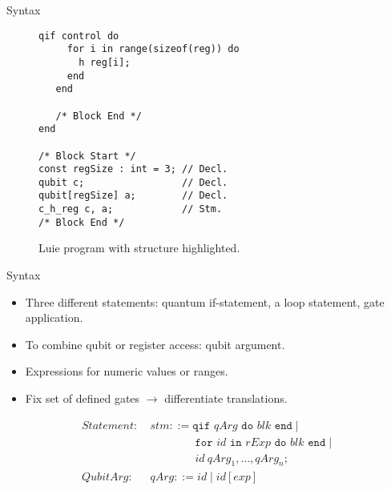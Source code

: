 \begin{frame}[fragile]{Syntax}
\begin{minipage}{.50\textwidth}
\begin{figure}[htp]
\begin{lstlisting}[style=Luie, basicstyle=\ttfamily\large]
   qif control do
     for i in range(sizeof(reg)) do
       h reg[i];  
     end
   end

   /* Block End */
end

/* Block Start */
const regSize : int = 3; // Decl.
qubit c;                 // Decl.
qubit[regSize] a;        // Decl.
c_h_reg c, a;            // Stm.
/* Block End */
            \end{lstlisting}
            \caption{Luie program with structure highlighted.}
        \end{figure}
    \end{minipage}
\end{frame}


\newcommand{\adown}{\rotatebox[origin=c]{90}{$\Lsh$}}
\newcommand{\aup}{\rotatebox[origin=c]{90}{$\Rsh$}}
\begin{frame}[fragile]{Syntax}
    \begin{minipage}{.45\textwidth}
        \begin{itemize}
            \item Three different statements: quantum if-statement, a loop statement, gate application.
            \item To combine qubit or register access: qubit argument.
            \item Expressions for numeric values or ranges.
            \item Fix set of defined gates $\to$ differentiate translations.
        \end{itemize}
        \Large
        \begin{align*}
            Statement: \ & stm ::= \texttt{qif } qArg \texttt{ do }  blk \texttt{ end} \mid\\
            & \quad \quad \quad \quad \texttt{for } id \texttt{ in } rExp \texttt{ do } blk \texttt{ end} \mid \\
            & \quad \quad \quad \quad id \ qArg_1, \dots, qArg_n \texttt{;}\\
            QubitArg: \ & qArg ::= id \mid id[exp]\\
    \end{align*}
    \end{minipage}

\end{frame}
